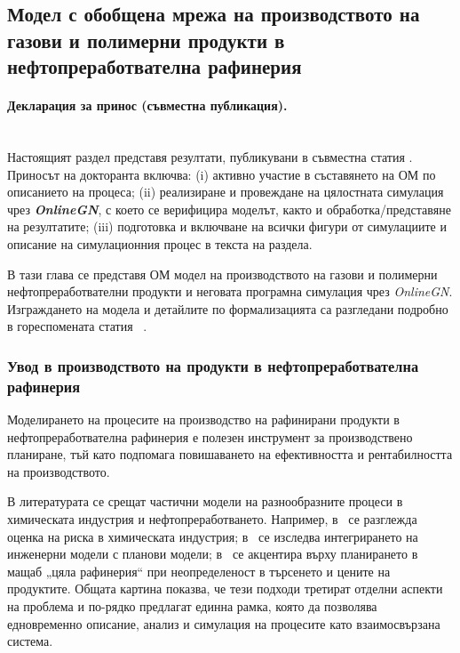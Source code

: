 \subsection{Модел с обобщена мрежа на производството на газови и полимерни продукти в нефтопреработвателна рафинерия}

\paragraph{Декларация за принос (съвместна публикация).}
\mbox{}\\
Настоящият раздел представя резултати, публикувани в съвместна статия \cite{Stratiev2023_1}.
Приносът на докторанта включва: (i) активно участие в съставянето на ОМ по описанието на процеса;
(ii) реализиране и провеждане на цялостната симулация чрез \textbf{\textit{OnlineGN}}, с което се верифицира моделът,
както и обработка/представяне на резултатите; (iii) подготовка и включване на всички фигури от симулациите и
описание на симулационния процес в текста на раздела.

В тази глава се представя ОМ модел на производството на газови и полимерни нефтопреработвателни продукти и неговата програмна симулация чрез \textit{OnlineGN}. Изграждането на модела и детайлите по формализацията са разгледани подробно в гореспомената статия ~\cite{Stratiev2023_1}.

\subsubsection{Увод в производството на продукти в нефтопреработвателна рафинерия}

\hspace*{2.5em}Моделирането на процесите на производство на рафинирани продукти в нефтопреработвателна рафинерия е полезен инструмент за производствено планиране, тъй като подпомага повишаването на ефективността и рентабилността на производството.

В литературата се срещат частични модели на разнообразните процеси в химическата индустрия и нефтопреработването. Например, в~\cite{Zhou2017} се разглежда оценка на риска в химическата индустрия; в~\cite{Infosys2018} се изследва интегрирането на инженерни модели с планови модели; в~\cite{40} се акцентира върху планирането в мащаб „цяла рафинерия“ при неопределеност в търсенето и цените на продуктите. Общата картина показва, че тези подходи третират отделни аспекти на проблема и по-рядко предлагат единна рамка, която да позволява едновременно описание, анализ и симулация на процесите като взаимосвързана система.

